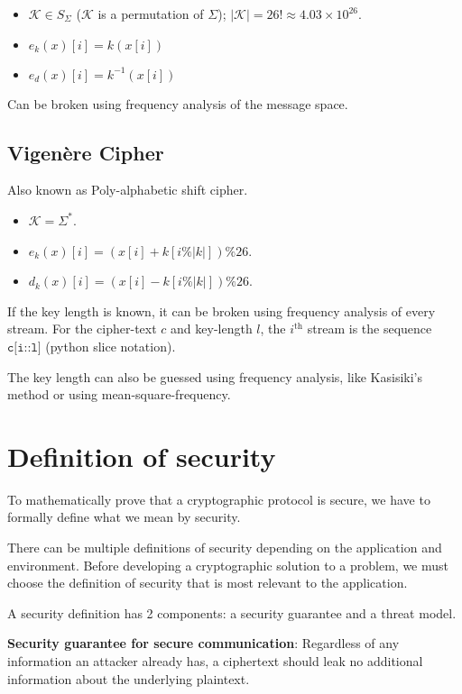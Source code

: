 \begin{itemize}
\item $\mathcal{K} \in S_{\Sigma}$ ($\mathcal{K}$ is a permutation of $\Sigma$);
  $|\mathcal{K}| = 26! \approx 4.03 \times 10^{26}$.
\item $e_k(x)[i] = k(x[i])$
\item $e_d(x)[i] = k^{-1}(x[i])$
\end{itemize}

Can be broken using frequency analysis of the message space.

\subsection{Vigen\`ere Cipher}

Also known as Poly-alphabetic shift cipher.

\begin{itemize}
\item $\mathcal{K} = \Sigma^*$.
\item $e_k(x)[i] = (x[i] + k[i\%|k|])\%26$.
\item $d_k(x)[i] = (x[i] - k[i\%|k|])\%26$.
\end{itemize}

If the key length is known, it can be broken using frequency analysis of every stream.
For the cipher-text $c$ and key-length $l$, the $i^{\textrm{th}}$ stream is the sequence
$\texttt{c[i::l]}$ (python slice notation).

The key length can also be guessed using frequency analysis,
like Kasisiki's method or using mean-square-frequency.

\section{Definition of security}

To mathematically prove that a cryptographic protocol is secure,
we have to formally define what we mean by security.

There can be multiple definitions of security depending on the application and environment.
Before developing a cryptographic solution to a problem, we must
choose the definition of security that is most relevant to the application.

A security definition has 2 components: a security guarantee and a threat model.

\textbf{Security guarantee for secure communication}:
Regardless of any information an attacker already has,
a ciphertext should leak no additional information about the underlying plaintext.

